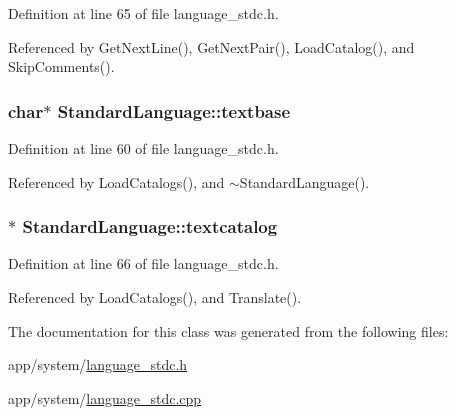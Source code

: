 Definition at line 65 of file language\+\_\+stdc.\+h.



Referenced by Get\+Next\+Line(), Get\+Next\+Pair(), Load\+Catalog(), and Skip\+Comments().

\subsubsection[{\texorpdfstring{textbase}{textbase}}]{\setlength{\rightskip}{0pt plus 5cm}char$\ast$ Standard\+Language\+::textbase\hspace{0.3cm}{\ttfamily [private]}}\hypertarget{classStandardLanguage_a6b73c841d7401e608576087468ccc088}{}\label{classStandardLanguage_a6b73c841d7401e608576087468ccc088}


Definition at line 60 of file language\+\_\+stdc.\+h.



Referenced by Load\+Catalogs(), and $\sim$\+Standard\+Language().

\subsubsection[{\texorpdfstring{textcatalog}{textcatalog}}]{$\ast$ Standard\+Language\+::textcatalog\hspace{0.3cm}{\ttfamily [private]}}\hypertarget{classStandardLanguage_a2b32cc8ca90d4e3da23b83647ce83031}{}\label{classStandardLanguage_a2b32cc8ca90d4e3da23b83647ce83031}


Definition at line 66 of file language\+\_\+stdc.\+h.



Referenced by Load\+Catalogs(), and Translate().



The documentation for this class was generated from the following files\+:\begin{DoxyCompactItemize}
\item 
app/system/\hyperlink{language__stdc_8h}{language\+\_\+stdc.\+h}\item 
app/system/\hyperlink{language__stdc_8cpp}{language\+\_\+stdc.\+cpp}\end{DoxyCompactItemize}
